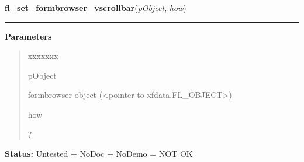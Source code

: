 \hspace{.8\funcindent}\begin{boxedminipage}{\funcwidth}

    \raggedright \textbf{fl\_set\_formbrowser\_vscrollbar}(\textit{pObject}, \textit{how})

    \vspace{-1.5ex}

    \rule{\textwidth}{0.5\fboxrule}
\setlength{\parskip}{2ex}
\setlength{\parskip}{1ex}
      \textbf{Parameters}
      \vspace{-1ex}

      \begin{quote}
        \begin{Ventry}{xxxxxxx}

          \item[pObject]

          formbrowser object ({\textless}pointer to 
          xfdata.FL\_OBJECT{\textgreater})

          \item[how]

          ?

        \end{Ventry}

      \end{quote}

\textbf{Status:} Untested + NoDoc + NoDemo = NOT OK



    \end{boxedminipage}

    \label{xformslib:library:fl_get_formbrowser_topform}

    \vspace{0.5ex}


